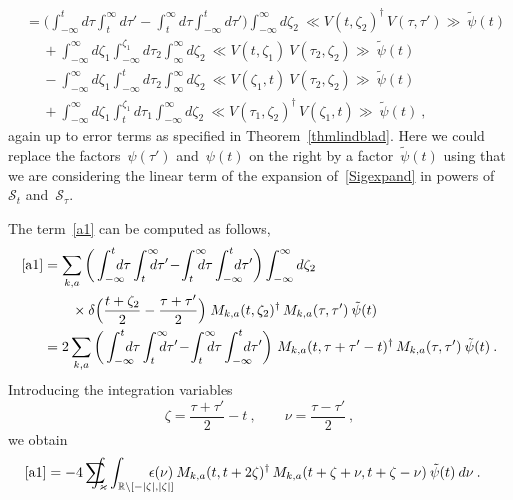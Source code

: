 \documentclass[reqno,11pt]{amsart}
\numberwithin{equation}{section}
\newcommand{\bbra}{\mathopen{\ll}}
\newcommand{\kket}{\mathclose{\gg}}
\newcommand{\R}{\mathbb{R}}
\newcommand{\1}{\mathds{1}}
\newcommand{\Sig}{\mathscr{S}}
\newcommand{\sint}{\sum  \!\!\!\!\!\!\! \int }
\begin{document}
{\begin{align}
&= \bigg( \int_{-\infty}^t \!\!\!\!\!d\tau \int_t^\infty \!\!\!\!\!d\tau' \!-\! \int_t^\infty \!\!\!\!\!d\tau \int_{-\infty}^t \!\!\!\!\!d\tau' \bigg) \int_{-\infty}^\infty d\zeta_2 \: \bbra V(t, \zeta_2)^\dagger \,V(\tau,\tau') \kket \:\tilde{\psi}(t) \label{a1} \\
&\quad\: + \int_{-\infty}^\infty d\zeta_1 \int_{-\infty}^{\zeta_1} d\tau_2 \int_{\infty}^\infty
d\zeta_2\: \bbra V(t,\zeta_1) \:V(\tau_2, \zeta_2) \kket \:\tilde{\psi}(t) \label{a2} \\
&\quad\: - \int_{-\infty}^\infty d\zeta_1 \int_{-\infty}^t d\tau_2 \int_{\infty}^\infty
d\zeta_2\: \bbra V(\zeta_1, t) \:V(\tau_2, \zeta_2) \kket \:\tilde{\psi}(t) \label{a22} \\
&\quad\: + \int_{-\infty}^\infty d\zeta_1 \int_t^{\zeta_1} d\tau_1 \int_{-\infty}^\infty d\zeta_2\:
\bbra V(\tau_1, \zeta_2)^\dagger\,V(\zeta_1,t) \kket\:\tilde{\psi}(t) \:, \label{a3}
\end{align}
again up to error terms as specified in Theorem~\ref{thmlindblad}.
Here we could replace the factors~$\psi(\tau')$ and~$\psi(t)$ on the right by
a factor~$\tilde{\psi}(t)$ using that we are considering the linear term of the expansion
of~\eqref{Sigexpand} in powers of~$\Sig_t$ and~$\Sig_\tau$.

The term~\eqref{a1} can be computed as follows,
\begin{align}
\eqref{a1}
&= \sum_{k,a}
\bigg( \int_{-\infty}^t \!\!\!\!\!d\tau \int_t^\infty \!\!\!\!\!d\tau' \!-\! \int_t^\infty \!\!\!\!\!d\tau \int_{-\infty}^t \!\!\!\!\!d\tau' \bigg) \int_{-\infty}^\infty d\zeta_2 \notag \\
&\qquad \times \delta \Big( \frac{t+\zeta_2}{2} - \frac{\tau+\tau'}{2}\Big) \;
M_{k,a}(t, \zeta_2)^\dagger \,M_{k,a}(\tau,\tau') \:\tilde{\psi}(t) \notag \\
&= 2 \sum_{k,a}
\bigg( \int_{-\infty}^t \!\!\!\!\!d\tau \int_t^\infty \!\!\!\!\!d\tau' \!-\! \int_t^\infty \!\!\!\!\!d\tau \int_{-\infty}^t \!\!\!\!\!d\tau' \bigg)  \
M_{k,a}(t, \tau+\tau'-t)^\dagger \,M_{k,a}(\tau,\tau') \:\tilde{\psi}(t) \:. \notag
\end{align}
Introducing the integration variables
\[ \zeta = \frac{\tau+\tau'}{2} -t \:,\qquad \nu = \frac{\tau-\tau'}{2}\:, \]
we obtain
\begin{align*}
\eqref{a1} &= -4 \sint_\varkappa 
\int_{\R \setminus [-|\zeta|, |\zeta|]} \!\!\!\!\!\!\!\!\!\!\!\!\epsilon(\nu)\:
M_{k,a}(t, t+2 \zeta)^\dagger \,M_{k,a}(t+\zeta+\nu, t+\zeta-\nu) \:\tilde{\psi}(t) \: d\nu \:.
\end{align*}

}
\end{document}
